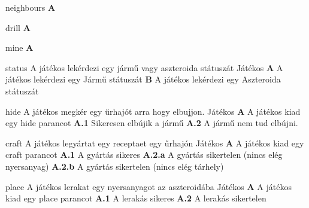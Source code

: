 \documentclass[../../projlab]{subfiles}
\begin{document}
\begin{use-case}
    {neighbours}
    { }
    {} 
    \textbf{A} \newline

\end{use-case}

\begin{use-case}
    {drill}
    { }
    {} 
    \textbf{A} \newline

\end{use-case}

\begin{use-case}
    {mine}
    { }
    {} 
    \textbf{A} \newline

\end{use-case}

\begin{use-case}
    {status}
    {A játékos lekérdezi egy jármű vagy aszteroida státuszát}
    {Játékos} 
    \textbf{A} A játékos lekérdezi egy Jármű státuszát \newline
    \textbf{B} A játékos lekérdezi egy Aszteroida státuszát
\end{use-case}

\begin{use-case}
    {hide}
    {A játékos megkér egy űrhajót arra hogy elbujjon.}
    {Játékos} 
    \textbf{A} A játékos kiad egy hide parancot \newline
    \textbf{A.1} Sikeresen elbújik a jármű \newline
    \textbf{A.2} A jármű nem tud elbújni.
\end{use-case}

\begin{use-case}
    {craft}
    {A játékos legyártat egy receptaet egy űrhajón}
    {Játékos} 
    \textbf{A} A játékos kiad egy craft parancot \newline
    \textbf{A.1} A gyártás sikeres \newline
    \textbf{A.2.a} A gyártás sikertelen (nincs elég nyersanyag)
    \textbf{A.2.b} A gyártás sikertelen (nincs elég tárhely)
\end{use-case}

\begin{use-case}
    {place}
    {A játékos lerakat egy nyersanyagot az aszteroidába}
    {Játékos} 
    \textbf{A} A játékos kiad egy place parancot \newline
    \textbf{A.1} A lerakás sikeres \newline
    \textbf{A.2} A lerakás sikertelen 
\end{use-case}
\end{document}
